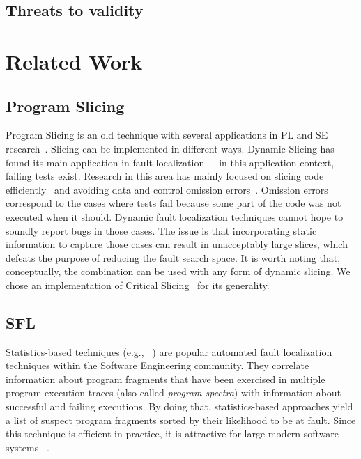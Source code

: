 \documentclass{article}
\begin{document}
\subsection{Threats to validity}


\section{Related Work}

\subsection{Program Slicing}

Program Slicing is an old technique with several applications in PL
and SE research~\cite{Weiser:1981:PS:800078.802557}. Slicing can be
implemented in different ways. Dynamic Slicing has found its main
application in fault
localization~\cite{Agrawal:1990:DPS:93542.93576}---in this application
context, failing tests exist. Research in this area has mainly focused
on slicing code
efficiently~\cite{Wang:2008:DSJ:1330017.1330021,Wang:2004:UCB:998675.999455}
and avoiding data and control omission
errors~\cite{Zhang:2007:TLE:1250734.1250782,Lin:2018:BDE:3238147.3238163}. Omission errors correspond to the
cases where tests fail because some part of the code was not executed
when it should. Dynamic fault localization techniques cannot hope to
soundly report bugs in those cases. The issue is that incorporating
static information to capture those cases can result in unacceptably
large slices, which defeats the purpose of reducing the fault search
space. It is worth noting that, conceptually, the \comb{} combination
can be used with any form of dynamic slicing. We chose an
implementation of Critical
Slicing~\cite{DeMillo:1996:CSS:229000.226310} for its generality.



\subsection{SFL}

Statistics-based techniques (e.g., ~\cite{Pearson:2017:EIF:3097368.3097441}) are
popular automated fault localization techniques within the Software Engineering
community. They correlate information about program fragments that have been
exercised in multiple program execution traces (also called \textit{program
spectra}) with information about successful and failing executions. By doing
that, statistics-based approaches yield a list of suspect program fragments
sorted by their likelihood to be at fault. Since this technique is efficient in
practice, it is attractive for large modern software systems ~\cite{Zoeteweij:2007:DES:1251988.1253298}.
\end{document}
